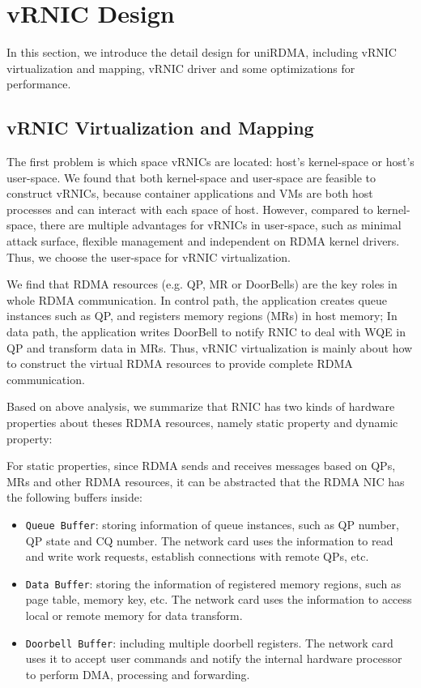 \section{vRNIC Design}
In this section, we introduce the detail design for uniRDMA, including vRNIC virtualization and mapping, vRNIC driver and some optimizations for performance.

\subsection{vRNIC Virtualization and Mapping}
The first problem is which space vRNICs are located: host's kernel-space or host's user-space. We found that both kernel-space and user-space are feasible to construct vRNICs, because container applications and VMs are both host processes and can interact with each space of host. However, compared to kernel-space, there are multiple advantages for vRNICs in user-space, such as minimal attack surface, flexible management and independent on RDMA kernel drivers. Thus, we choose the user-space for vRNIC virtualization.

We find that RDMA resources (e.g. QP, MR or DoorBells) are the key roles in whole RDMA communication. In control path, the application creates queue instances such as QP, and registers memory regions (MRs) in host memory; In data path, the application writes DoorBell to notify RNIC to deal with WQE in QP and transform data in MRs. Thus, vRNIC virtualization is mainly about how to construct the virtual RDMA resources to provide complete RDMA communication. 

Based on above analysis, we summarize that RNIC has two kinds of hardware properties about theses RDMA resources, namely static property and dynamic property:

For static properties, since RDMA sends and receives messages based on QPs, MRs and other RDMA resources, it can be abstracted that the RDMA NIC has the following buffers inside:

\begin{itemize}
	\item {\verb|Queue Buffer|}: storing information of queue instances, such as QP number, QP state and CQ number. The network card uses the information to read and write work requests, establish connections with remote QPs, etc.  
	\item {\verb|Data Buffer|}: storing the information of registered memory regions, such as page table, memory key, etc. The network card uses the information to access local or remote memory for data transform.  
	\item {\verb|Doorbell Buffer|}: including multiple doorbell registers. The network card uses it to accept user commands and notify the internal hardware processor to perform DMA, processing and forwarding. 
\end{itemize}


